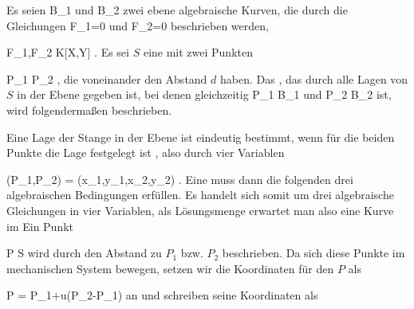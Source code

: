 {}
{





Es seien
\mathkor {} {B_1} {und} {B_2} {}
zwei ebene algebraische Kurven, die durch die Gleichungen
\mathkor {} {F_1=0} {und} {F_2=0} {}
beschrieben werden,

\mavergleichskette
{\vergleichskette
{ F_1,F_2
}
{ \in }{ K[X,Y]
}
{  }{
}
{    }{
}
{   }{
}
}
{}{}{.}
Es sei $S$ eine 
 {} {}
mit zwei Punkten

 {}
 {P_1 \neq P_2} {}
 {} {} {} {,}
die voneinander den Abstand $d$ haben. Das  {,} das durch alle Lagen von $S$ in der Ebene gegeben ist, bei denen gleichzeitig
\mathkor {} {P_1 \in B_1} {und} {P_2 \in B_2} {}
ist, wird folgendermaßen beschrieben.

Eine Lage der Stange in der Ebene ist eindeutig bestimmt, wenn für die beiden Punkte die Lage festgelegt ist
 {} {,}
also durch vier Variablen

\mavergleichskette
{\vergleichskette
{ (P_1,P_2)
}
{ = }{ (x_1,y_1,x_2,y_2)
}
{  }{
}
{    }{
}
{   }{
}
}
{}{}{.}
Eine  {} muss dann die folgenden drei algebraischen Bedingungen erfüllen.
Es handelt sich somit um drei algebraische Gleichungen in vier Variablen, als Lösungsmenge erwartet man also eine Kurve im
 Ein Punkt

\mavergleichskette
{\vergleichskette
{ P
}
{ \in }{ S
}
{  }{
}
{    }{
}
{   }{
}
}
{}{}{}
wird durch den Abstand zu $P_1$ bzw. $P_2$ beschrieben. Da sich diese Punkte im mechanischen System bewegen, setzen wir die Koordinaten für den  {} $P$ als

\mavergleichskettedisp
{\vergleichskette
{P
}
{ =} { P_1+u(P_2-P_1)
}
{ } {
}
{ } {
}
{ } {
}
}
{}{}{}
an
 {} {}
und schreiben seine Koordinaten als

}
